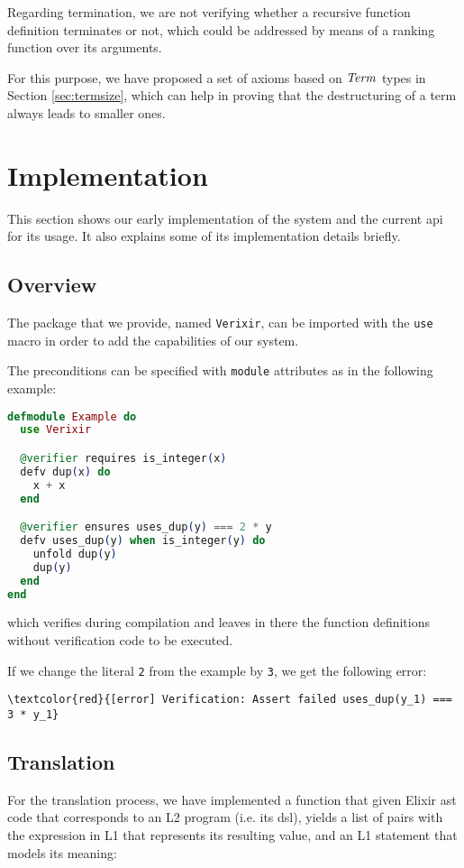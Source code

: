 Regarding termination, we are not verifying whether a recursive function 
definition terminates or not, which could be addressed by means of a ranking
function over its arguments.

For this purpose, we have proposed a set of axioms based on $\mathit{Term}$ types in
Section \ref{sec:termsize}, which can help in proving that the destructuring of
a term always leads to smaller ones.

\section{Implementation}

This section shows our early implementation of the system and the current
\gls{api} for its usage. It also explains some of its implementation details 
briefly.

\subsection{Overview}

The package that we provide, named \verb|Verixir|, can be imported 
with the \verb|use| macro in order to add the capabilities of our system.

The preconditions can be specified with \verb|module| attributes as in the 
following example:

\begin{lstlisting}[language=elixir,numbers=none,frame=none]
defmodule Example do
  use Verixir 

  @verifier requires is_integer(x)
  defv dup(x) do
    x + x
  end

  @verifier ensures uses_dup(y) === 2 * y
  defv uses_dup(y) when is_integer(y) do
    unfold dup(y)
    dup(y)
  end
end
\end{lstlisting}

which verifies during compilation and leaves in there the function definitions
without verification code to be executed.

If we change the literal \verb|2| from the example by \verb|3|, we get the
following error:

\begin{Verbatim}[commandchars=\\\{\}]
      \textcolor{red}{[error] Verification: Assert failed uses_dup(y_1) === 3 * y_1}
\end{Verbatim}

\subsection{Translation}
For the translation process, we have implemented a function that given Elixir \gls{ast}
code that corresponds to an L2 program (i.e. its \gls{dsl}), yields a list of
pairs with the expression in L1 that represents its resulting value, and an L1
statement that models its meaning:

